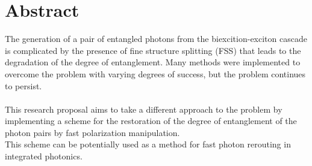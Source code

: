 \chapter*{Abstract}
The generation of a pair of entangled photons from the biexcition-exciton cascade is complicated by the presence of fine structure splitting (FSS) that leads to the degradation of the degree of entanglement. Many methods were implemented to overcome the problem with varying degrees of success, but the problem continues to persist.  \\ \\
This research proposal aims to take a different approach to the problem by implementing a scheme for the restoration of the degree of entanglement of the photon pairs by fast polarization manipulation.\\
This scheme can be potentially used as a method for fast photon rerouting in integrated photonics.   





